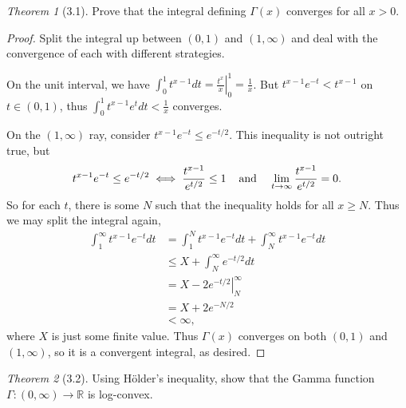 \documentclass[12pt]{article}
\theoremstyle{remark}
\theoremstyle{named}
\newtheorem*{theorem}{Theorem}
\newcommand{\R}{\mathbb R}
\newcommand{\g}{\Gamma}
\begin{document}
\begin{theorem}[3.1]
    Prove that the integral defining \(\g(x)\) converges for all \(x > 0\).
\end{theorem}

\begin{proof}
    Split the integral up between \((0, 1)\) and \((1, \infty)\) and deal with the convergence of each with different strategies. 

    On the unit interval, we have \(\int_{0}^{1} t^{x - 1} dt = \left . \frac{t^x}{x}\right |_{0}^1 = \frac{1}{x}\). But \(t^{x - 1}e^{-t} < t^{x - 1}\) on \(t \in (0, 1)\), thus \(\int_{0}^{1} t^{x - 1} e^t dt < \frac{1}{x}\) converges.

    On the \((1, \infty)\) ray, consider \(t^{x - 1} e^{-t} \leq e^{-t/2}\). This inequality is not outright true, but
    \[t^{x - 1} e^{-t} \leq e^{-t/2} \iff \frac{t^{x - 1}}{e^{t/2}} \leq 1 \hspace*{4mm} \text{and} \hspace*{4mm} \lim_{t \to \infty} \frac{t^{x - 1}}{e^{t/2}} = 0.\] 
    So for each \(t\), there is some \(N\) such that the inequality holds for all \(x \geq N\). Thus we may split the integral again,
    \begin{align*}
        \int_{1}^{\infty} t^{x - 1} e^{-t} dt &= \int_{1}^{N} t^{x - 1} e^{-t} dt + \int_{N}^{\infty} t^{x - 1} e^{-t} dt \\
        &\leq X + \int_{N}^{\infty} e^{-t/2} dt \\
        &= X - \left . 2e^{-t/2}\right |_N^\infty \\ 
        &= X + 2e^{-N/2} \\
        &< \infty,
    \end{align*} 
    where \(X\) is just some finite value. Thus \(\g(x)\) converges on both \((0, 1)\) and \((1, \infty)\), so it is a convergent integral, as desired.
\end{proof}

\begin{theorem}[3.2]
    Using H\"older's inequality, show that the Gamma function \(\g : (0, \infty) \to \R\) is log-convex.
\end{theorem}
\end{document}
